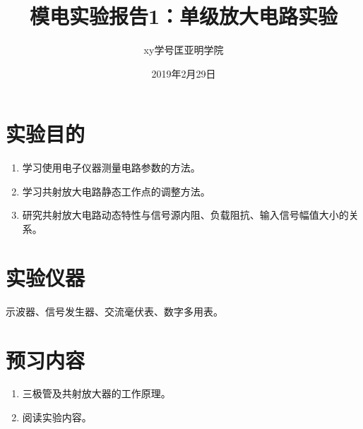 \documentclass[a4paper]{article}
\title{模电实验报告1：单级放大电路实验}
\author{xy\quad 学号\quad 匡亚明学院}
\date{2019年2月29日}
\begin{document}
\maketitle

\section{实验目的}
\begin{enumerate}
\item 学习使用电子仪器测量电路参数的方法。
\item 学习共射放大电路静态工作点的调整方法。
\item 研究共射放大电路动态特性与信号源内阻、负载阻抗、输入信号幅值大小的关系。
\end{enumerate}
\section{实验仪器}
示波器、信号发生器、交流毫伏表、数字多用表。
\section{预习内容}
\begin{enumerate}
\item 三极管及共射放大器的工作原理。
\item 阅读实验内容。
\end{enumerate}
\end{document}
